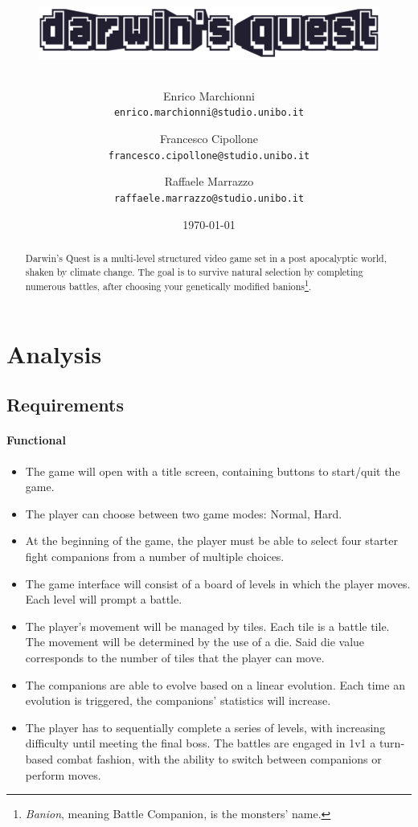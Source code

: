 \documentclass[12pt, a4paper]{report}
\title{
    \begin{figure}[ht]
    \centering{}
    \includegraphics[width=\textwidth]{logo} %
    \end{figure}
}
\author{
    Enrico Marchionni\\
    \texttt{enrico.marchionni@studio.unibo.it}
    \and
    Francesco Cipollone\\
    \texttt{francesco.cipollone@studio.unibo.it}
    \and
    Raffaele Marrazzo\\
    \texttt{raffaele.marrazzo@studio.unibo.it}
}
\date{\today}
\begin{document}
\maketitle

\begin{abstract}

    Darwin's Quest \cite{ontheoriginofspiecies} is a multi-level structured video game set in a post apocalyptic world,
    shaken by climate change. The goal is to survive natural selection by completing numerous battles,
    after choosing your genetically modified banions\footnote{\emph{Banion}, meaning Battle Companion, is the monsters' name.}.

\end{abstract}

\tableofcontents

\chapter{Analysis}

\section{Requirements}

\subsubsection{Functional}

\begin{itemize}
    \item The game will open with a title screen, containing buttons to start/quit the game.
    \item The player can choose between two game modes: Normal, Hard.
    \item At the beginning of the game, the player must be able to select four starter fight companions from a number of multiple choices.
    \item The game interface will consist of a board of levels in which the player moves. Each level will prompt a battle.
    \item The player's movement will be managed by tiles. Each tile is a battle tile.
        The movement will be determined by the use of a die. Said die value corresponds to the number of tiles that the player can move.
    \item The companions are able to evolve based on a linear evolution. Each time an evolution is triggered, the companions' statistics will increase.
    \item The player has to sequentially complete a series of levels, with increasing difficulty until meeting the final boss.
        The battles are engaged in 1v1 a turn-based combat fashion, with the ability to switch between companions or perform moves.
\end{itemize}
\end{document}
